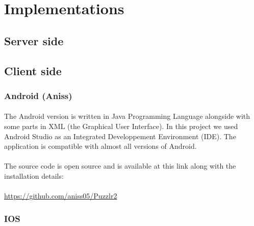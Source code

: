 \section{Implementations}
  \subsection{Server side}
  \subsection{Client side}
    \subsubsection{Android (Aniss)}
      \paragraph{}
	The Android version is written in Java Programming Language alongside with some parts in XML (the Graphical User Interface). In this project we used Android Studio as an Integrated Developpement Environment (IDE). The application is compatible with almost all versions of Android.
	\paragraph{}
	The source code is open source and is available at this link along with the installation details:
	\paragraph{}
	\color{blue}\underline{https://github.com/aniss05/Puzzlr2}\color{black} 
	  
    \subsubsection{IOS}